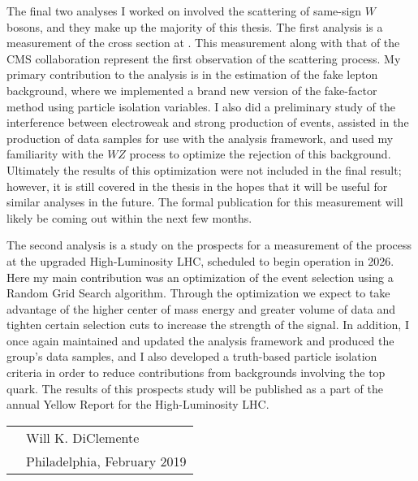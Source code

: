The final two analyses I worked on involved the scattering of same-sign $W$ bosons, and they make up the majority of this thesis.
The first analysis is a measurement of the \ssww cross section at .
This measurement along with that of the CMS collaboration represent the first observation of the \ssww scattering process.
My primary contribution to the analysis is in the estimation of the fake lepton background, where we implemented a brand new version of the fake-factor method using particle isolation variables.
I also did a preliminary study of the interference between electroweak and strong production of \ssww events, assisted in the production of data samples for use with the analysis framework, and used my familiarity with the $WZ$ process to optimize the rejection of this background.
Ultimately the results of this optimization were not included in the final result; however, it is still covered in the thesis in the hopes that it will be useful for similar analyses in the future.
The formal publication for this measurement will likely be coming out within the next few months.

The second \ssww analysis is a study on the prospects for a measurement of the process at the upgraded High-Luminosity LHC, scheduled to begin operation in 2026.
Here my main contribution was an optimization of the event selection using a Random Grid Search algorithm.
Through the optimization we expect to take advantage of the higher center of mass energy and greater volume of data and tighten certain selection cuts to increase the strength of the \ssww signal.
In addition, I once again maintained and updated the analysis framework and produced the group's data samples, and I also developed a truth-based particle isolation criteria in order to reduce contributions from backgrounds involving the top quark.
The results of this prospects study will be published as a part of the annual Yellow Report for the High-Luminosity LHC.



\vspace{0.05\textheight}

\begin{tabular}{p{} l}
  & Will K. DiClemente           \\
  & Philadelphia, February 2019  \\
\end{tabular}

